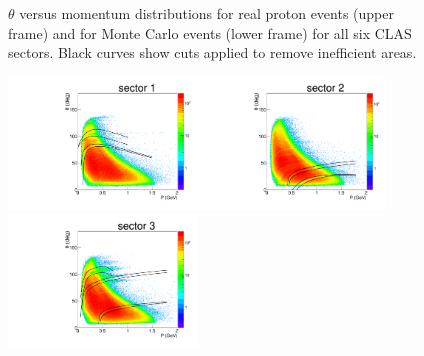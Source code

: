 \begin{figure}[htp]
\begin{center}
\begin{minipage}{.99\textwidth}
\begin{framed}
\end{framed}
\end{minipage}
\caption{\small $\theta$ versus momentum distributions for real proton events (upper frame)  and for Monte Carlo events (lower frame) for all six CLAS sectors. Black curves show cuts applied to remove inefficient areas. \label{fig:other_cuts_positive_th_vs_p_protons}}
\end{center}
\end{figure}


\begin{figure}[htp]
\begin{center}
\begin{minipage}{.99\textwidth}
\begin{framed}
\includegraphics[width=5cm]{pictures/other_cuts/fiduch/th_vs_p_pip/pip_th_vs_p_sector1.pdf}\includegraphics[width=5cm]{pictures/other_cuts/fiduch/th_vs_p_pip/pip_th_vs_p_sector2.pdf}\includegraphics[width=5cm]{pictures/other_cuts/fiduch/th_vs_p_pip/pip_th_vs_p_sector3.pdf}

\end{framed}
\end{minipage}
\end{center}
\end{figure}
